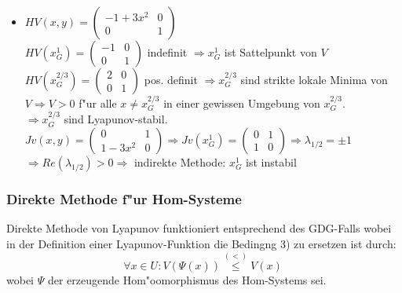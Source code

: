 \documentclass[a4paper, 13pt]{scrreprt}
\theoremstyle{definition} \newtheorem{definition}{Definition}[section]
\newenvironment{beispiel}[1][Beispiel]{\begin{trivlist}
\item[\hskip \labelsep {\bfseries #1}]}{\end{trivlist}}
\begin{document}
\begin{beispiel}
\begin{itemize}
\begin{itemize}
			\item \(HV(x,y) = \left(\begin{array}{cc} -1+3x^2 & 0 \\ 0 & 1 \end{array}\right) \) \\
						\(HV(x_G^1) = \left(\begin{array}{cc} -1 & 0 \\ 0 & 1 \end{array} \right)\) indefinit \(\Rightarrow x_G^1\) ist Sattelpunkt von \(V\) \\
						\(HV(x_G^{2/3}) = \left(\begin{array}{cc} 2 & 0 \\ 0 & 1 \end{array}\right) \) pos. definit \(\Rightarrow x_G^{2/3} \) sind strikte lokale Minima von \(V \Rightarrow V > 0\) f"ur alle \( x \not= x_G^{2/3}\) in einer gewissen Umgebung von \(x_G^{2/3}\).\\
						\(\Rightarrow x_G^{2/3} \) sind Lyapunov-stabil.\\
						\(Jv(x,y) = \left( \begin{array}{cc} 0 & 1 \\ 1-3x^2 & 0 \end{array}\right)
						\Rightarrow Jv(x_G^1) = \left( \begin{array}{cc} 0 & 1 \\ 1 & 0 \end{array}\right) \Rightarrow \lambda_{1/2} = \pm 1 \) \\
						\( \Rightarrow Re(\lambda_{1/2}) > 0 \Rightarrow \) indirekte Methode: \(x_G^1\) ist instabil
			\end{itemize}
	
\end{itemize}
\end{beispiel}

\subsubsection{Direkte Methode f"ur Hom-Systeme} 
Direkte Methode von Lyapunov funktioniert entsprechend des GDG-Falls wobei in der Definition einer Lyapunov-Funktion die Bedingng 3) zu ersetzen ist durch: 
	\[\forall x \in U: V(\Psi(x)) \stackrel{(<)} \leq V(x)\  \]
wobei \(\Psi\) der erzeugende Hom"oomorphismus des Hom-Systems sei.


\end{document}
